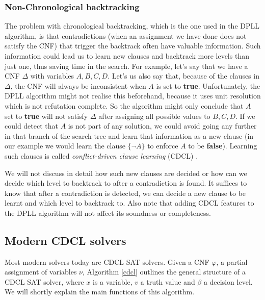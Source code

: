 \documentclass[12pt]{diicc}
\begin{document}
\subsubsection{Non-Chronological backtracking}

The problem with chronological backtracking, which is the one used in the DPLL algorithm, is that contradictions (when an assignment we have done does not satisfy the CNF) that trigger the backtrack often have valuable information. Such information could lead us to learn new clauses and backtrack more levels than just one, thus saving time in the search. For example, let's say that we have a CNF $\Delta$ with variables $A,B,C,D$. Let's us also say that, because of the clauses in $\Delta$, the CNF will always be inconsistent when $A$ is set to \textbf{true}. Unfortunately, the DPLL algorithm might not realise this beforehand, because it uses unit resolution which is not refutation complete. So the algorithm might only conclude that $A$ set to \textbf{true} will not satisfy $\Delta$ after assigning all possible values to $B,C,D$. If we could detect that $A$ is not part of any solution, we could avoid going any further in that branch of the search tree and learn that information as a new clause (in our example we would learn the clause $\{\neg A\}$ to enforce $A$ to be \textbf{false}). Learning such clauses is called \textit{conflict-driven clause learning} (CDCL) \cite{cdcl1,cdcl2}.

We will not discuss in detail how such new clauses are decided or how can we decide which level to backtrack to after a contradiction is found. It suffices to know that after a contradiction is detected, we can decide a new clause to be learnt and which level to backtrack to. Also note that adding CDCL features to the DPLL algorithm will not affect its soundness or completeness.

\subsection{Modern CDCL solvers}

Most modern solvers today are CDCL SAT solvers. Given a CNF $\varphi$, a partial assignment of variables $\nu$, Algorithm \ref{cdcl} outlines the general structure of a CDCL SAT solver, where $x$ is a variable, $v$ a truth value and $\beta$ a decision level. We will shortly explain the main functions of this algorithm.
\end{document}
